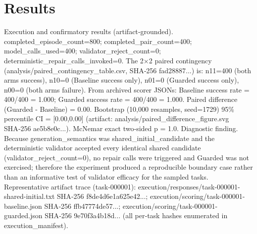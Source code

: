 \documentclass[conference]{IEEEtran}
\begin{document}
\section{Results}
Execution and confirmatory results (artifact‑grounded). completed\_episode\_count=800; completed\_pair\_count=400; model\_calls\_used=400; validator\_reject\_count=0; deterministic\_repair\_calls\_invoked=0. The 2×2 paired contingency (analysis/paired\_contingency\_table.csv, SHA‑256 fad28887...) is: n11=400 (both arms success), n10=0 (Baseline success only), n01=0 (Guarded success only), n00=0 (both arms failure). From archived scorer JSONs: Baseline success rate = 400/400 = 1.000; Guarded success rate = 400/400 = 1.000. Paired difference (Guarded - Baseline) = 0.00. Bootstrap (10,000 resamples, seed=1729) 95\% percentile CI = [0.00,0.00] (artifact: analysis/paired\_difference\_figure.svg SHA‑256 ae5b8e0c...). McNemar exact two‑sided p = 1.0. Diagnostic finding. Because generation\_semantics was shared\_initial\_candidate and the deterministic validator accepted every identical shared candidate (validator\_reject\_count=0), no repair calls were triggered and Guarded was not exercised; therefore the experiment produced a reproducible boundary case rather than an informative test of validator efficacy for the sampled tasks. Representative artifact trace (task‑000001): execution/responses/task-000001-shared-initial.txt SHA‑256 f8de4d6e1a625e42...; execution/scoring/task-000001-baseline.json SHA‑256 ffb47774de57...; execution/scoring/task-000001-guarded.json SHA‑256 9e70f3a4b18d... (all per‑task hashes enumerated in execution\_manifest).
\end{document}
